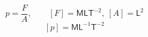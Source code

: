 \[ p = \frac{F}{A}, \qquad [F] = \mathsf{M}\mathsf{L}\mathsf{T}^{-2},\ [A] = \mathsf{L}^{2} \]
\[ [p] = \mathsf{M}\mathsf{L}^{-1}\mathsf{T}^{-2} \]

